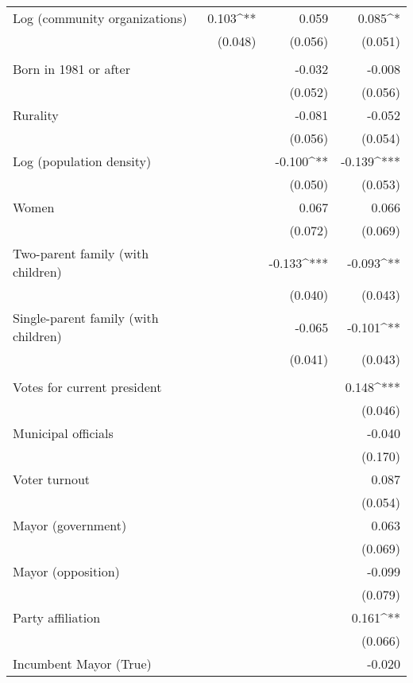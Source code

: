 \begin{table}[!h]
\begin{tabular}{@{\extracolsep{-10pt}}lD{.}{.}{-3} D{.}{.}{-3} D{.}{.}{-3} }
  Log (community organizations) & 0.103^{**} & 0.059 & 0.085^{*} \\ 
  & (0.048) & (0.056) & (0.051) \\ 
  \hline \\[-1.8ex]
  Born in 1981 or after &  & -0.032 & -0.008 \\ 
  &  & (0.052) & (0.056) \\ 
  Rurality &  & -0.081 & -0.052 \\ 
  &  & (0.056) & (0.054) \\ 
  Log (population density) &  & -0.100^{**} & -0.139^{***} \\ 
  &  & (0.050) & (0.053) \\ 
  Women &  & 0.067 & 0.066 \\ 
  &  & (0.072) & (0.069) \\ 
  Two-parent family (with children) &  & -0.133^{***} & -0.093^{**} \\ 
  &  & (0.040) & (0.043) \\ 
  Single-parent family (with children) &  & -0.065 & -0.101^{**} \\ 
  &  & (0.041) & (0.043) \\ 
  \hline \\[-1.8ex]
  Votes for current president &  &  & 0.148^{***} \\ 
  &  &  & (0.046) \\ 
  Municipal officials &  &  & -0.040 \\ 
  &  &  & (0.170) \\ 
  Voter turnout &  &  & 0.087 \\ 
  &  &  & (0.054) \\ 
  Mayor (government) &  &  & 0.063 \\ 
  &  &  & (0.069) \\ 
  Mayor (opposition) &  &  & -0.099 \\ 
  &  &  & (0.079) \\ 
  Party affiliation &  &  & 0.161^{**} \\ 
  &  &  & (0.066) \\ 
  Incumbent Mayor (True) &  &  & -0.020 \\ 

\end{tabular}
\end{table}
